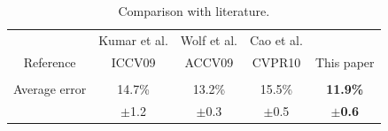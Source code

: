 \begin{table}
\caption{Comparison with literature.} 

\begin{tabular}{|c||c|c|c|c|}
\hline
 & Kumar et al. & Wolf et al. & Cao et al. & \\
Reference & ICCV09 & ACCV09 & CVPR10 & This paper\\
& \cite{kumar:iccv09} & \cite{wolf:accv09} & \cite{cao2010face} & \\
\hline\hline
Average error & 14.7\% & 13.2\% & 15.5\% & \bf{11.9\%} \\
& $\pm$1.2 & $\pm$0.3 & $\pm$0.5 & \bf{$\pm$0.6} \\
\hline
\end{tabular}
\label{fig:table_soa}
\end{table}



